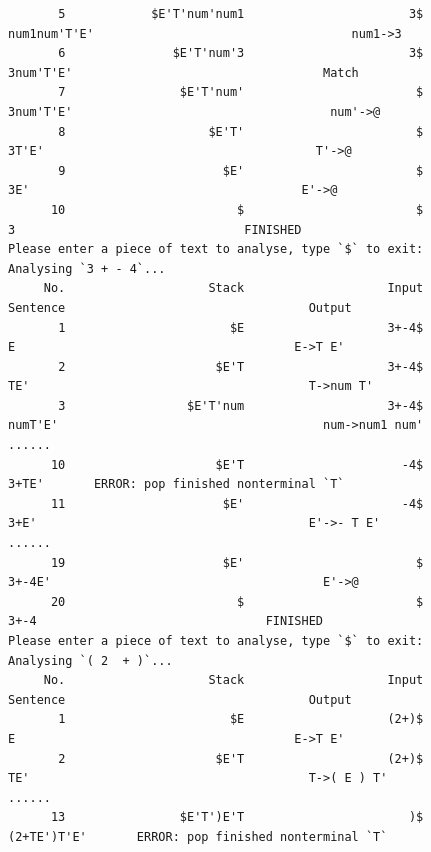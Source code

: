 \documentclass[UTF8]{ctexart}
\begin{document}
\begin{lstlisting}
       5            $E'T'num'num1                       3$                              num1num'T'E'                                    num1->3
       6               $E'T'num'3                       3$                              3num'T'E'                                   Match
       7                $E'T'num'                        $                             3num'T'E'                                    num'->@
       8                    $E'T'                        $                             3T'E'                                      T'->@
       9                      $E'                        $                             3E'                                      E'->@
      10                        $                        $                             3                                FINISHED
Please enter a piece of text to analyse, type `$` to exit:
Analysing `3 + - 4`...
     No.                    Stack                    Input                      Sentence                                  Output
       1                       $E                    3+-4$                              E                                       E->T E'
       2                     $E'T                    3+-4$                              TE'                                       T->num T'
       3                 $E'T'num                    3+-4$                              numT'E'                                     num->num1 num'
......
      10                     $E'T                      -4$                            3+TE'       ERROR: pop finished nonterminal `T`
      11                      $E'                      -4$                            3+E'                                      E'->- T E'
......
      19                      $E'                        $                          3+-4E'                                      E'->@
      20                        $                        $                          3+-4                                FINISHED
Please enter a piece of text to analyse, type `$` to exit:
Analysing `( 2  + )`...
     No.                    Stack                    Input                      Sentence                                  Output
       1                       $E                    (2+)$                              E                                       E->T E'
       2                     $E'T                    (2+)$                              TE'                                       T->( E ) T'
......
      13                $E'T')E'T                       )$                           (2+TE')T'E'       ERROR: pop finished nonterminal `T`

\end{lstlisting}
\end{document}
